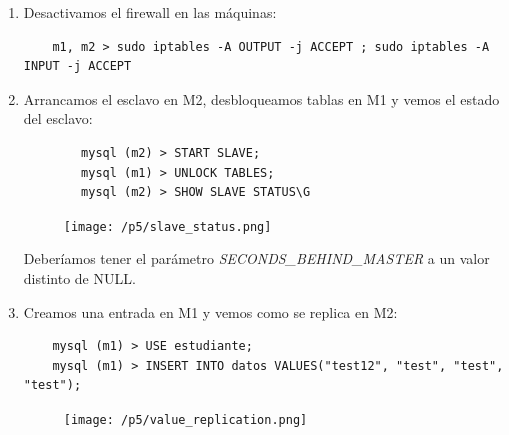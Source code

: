 \documentclass[12pt,spanish]{article}
\begin{document}
\begin{enumerate}
\begin{lstlisting}
	\end{lstlisting}
	\item Desactivamos el firewall en las máquinas:
	\begin{lstlisting}
	m1, m2 > sudo iptables -A OUTPUT -j ACCEPT ; sudo iptables -A INPUT -j ACCEPT
	\end{lstlisting}
	\item Arrancamos el esclavo en M2, desbloqueamos tablas en M1 y vemos el estado del esclavo:
	\begin{lstlisting}
		mysql (m2) > START SLAVE;
		mysql (m1) > UNLOCK TABLES;
		mysql (m2) > SHOW SLAVE STATUS\G
	\end{lstlisting}
	\begin{figure}[H]
		\centering
		\texttt{[image: /p5/slave\_status.png]}
	\end{figure}
	Deberíamos tener el parámetro \emph{SECONDS\_BEHIND\_MASTER} a un valor distinto de NULL.
	\item Creamos una entrada en M1 y vemos como se replica en M2:
	\begin{lstlisting}
	mysql (m1) > USE estudiante;
	mysql (m1) > INSERT INTO datos VALUES("test12", "test", "test", "test");
	\end{lstlisting}
	\begin{figure}[H]
		\centering
		\texttt{[image: /p5/value\_replication.png]}
	\end{figure}
\end{enumerate}
\end{document}
